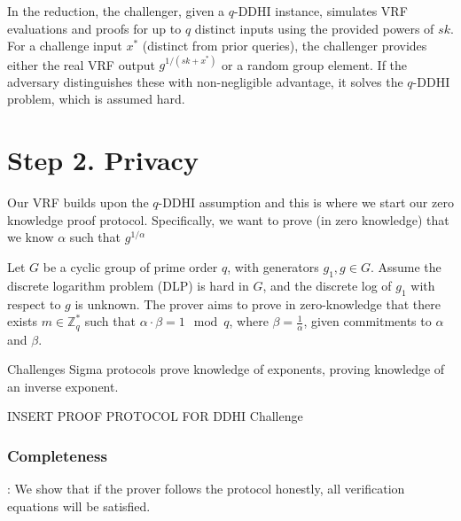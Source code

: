 In the reduction, the challenger, given a $q$-DDHI instance, simulates VRF evaluations and proofs for up to $q$ distinct inputs using the provided powers of $sk$. For a challenge input $x^*$ (distinct from prior queries), the challenger provides either the real VRF output $g^{1/(sk+x^*)}$ or a random group element. If the adversary distinguishes these with non-negligible advantage, it solves the $q$-DDHI problem, which is assumed hard.





















\section{Step 2. Privacy}
Our VRF builds upon the $q$-DDHI assumption and this is where we start our zero knowledge proof protocol. Specifically, we want to prove (in zero knowledge) that we know $\alpha$ such that $g^{1/\alpha}$ 

Let $G$ be a cyclic group of prime order $q$, with generators $g_1, g \in G$. Assume the discrete logarithm problem (DLP) is hard in $G$, and the discrete log of $g_1$ with respect to $g$ is unknown.
The prover aims to prove in zero-knowledge that there exists $m \in \mathbb{Z}_q^*$ such that $\alpha \cdot \beta = 1 \mod q$, where $\beta = \frac{1}{\alpha}$, given commitments to $\alpha$ and $\beta$.

Challenges
Sigma protocols prove knowledge of exponents, proving knowledge of an inverse exponent. 

INSERT PROOF PROTOCOL FOR DDHI Challenge

\subsubsection*{Completeness}:
We show that if the prover follows the protocol honestly, all verification equations will be satisfied.

